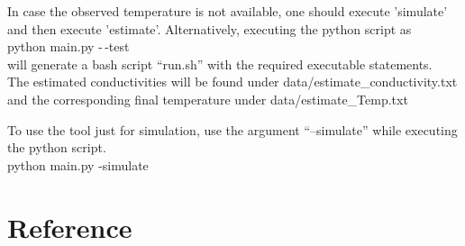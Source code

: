 \documentclass[10pt,a4paper]{report}
\begin{document}
\begin{appendices}
In case the observed temperature is not available, one should execute 'simulate' and then execute 'estimate'. Alternatively, executing the python script as \\

python main.py  -\,-test\\

will generate a bash script “run.sh” with the required executable statements.\\

The estimated conductivities will be found under data/estimate\_conductivity.txt and the corresponding final temperature under data/estimate\_Temp.txt

To use the tool just for simulation, use the argument “--simulate” while executing the python script.\\

python main.py -simulate

\end{appendices}


%
%
%
% 





\chapter*{Reference}


\end{document}
